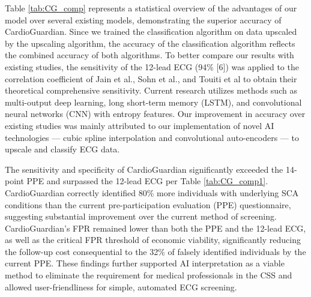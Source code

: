 \documentclass[
	a4paper, 
	10pt, 
	twoside, 
]{LTJournalArticle}
\begin{document}
Table \ref{tab:CG_comp} represents a statistical overview of the advantages of our model over several existing models, demonstrating the superior accuracy of CardioGuardian. Since we trained the classification algorithm on data upscaled by the upscaling algorithm, the accuracy of the classification algorithm reflects the combined accuracy of both algorithms. To better compare our results with existing studies, the sensitivity of the 12-lead ECG (94\% [6]) was applied to the correlation coefficient of Jain et al., Sohn et al., and Touiti et al to obtain their theoretical comprehensive sensitivity. Current research utilizes methods such as multi-output deep learning, long short-term memory (LSTM), and convolutional neural networks (CNN) with entropy features. Our improvement in accuracy over existing studies was mainly attributed to our implementation of novel AI technologies --- cubic spline interpolation and convolutional auto-encoders --- to upscale and classify ECG data. 

The sensitivity and specificity of CardioGuardian significantly exceeded the 14-point PPE and surpassed the 12-lead ECG per Table \ref{tab:CG_comp1}. CardioGuardian correctly identified 80\% more individuals with underlying SCA conditions than the current pre-participation evaluation (PPE) questionnaire, suggesting substantial improvement over the current method of screening. CardioGuardian's FPR remained lower than both the PPE and the 12-lead ECG, as well as the critical FPR threshold of economic viability, significantly reducing the follow-up cost consequential to the 32\% of falsely identified individuals by the current PPE. These findings further supported AI interpretation as a viable method to eliminate the requirement for medical professionals in the CSS and allowed user-friendliness for simple, automated ECG screening. 
\end{document}
